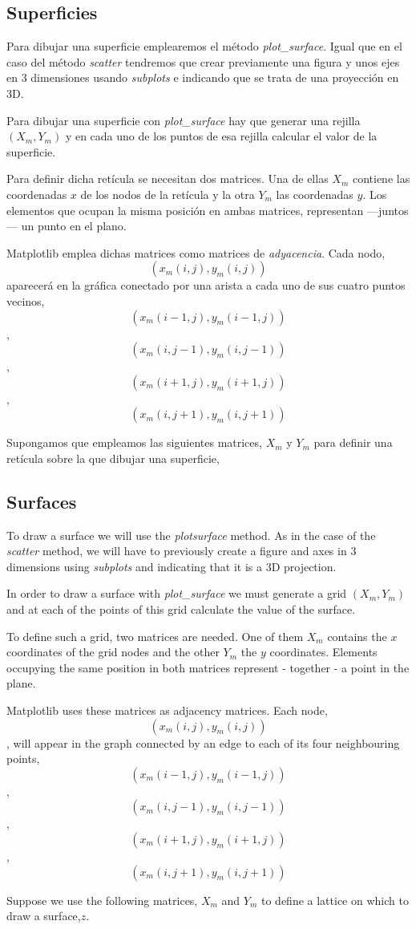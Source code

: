 \begin{paracol}{2}
\subsection{Superficies}
Para dibujar una superficie emplearemos el método \textit{plot\_surface}. Igual que en el caso del método \textit{scatter} tendremos que crear previamente una figura y unos ejes en 3 dimensiones usando \textit{subplots} e indicando que se trata de una proyección en 3D.

Para dibujar una superficie con \textit{plot\_surface} hay que generar una rejilla $(X_m,Y_m)$ y en cada uno de los puntos de esa rejilla calcular el valor de la superficie.

Para definir dicha retícula  se necesitan dos matrices. Una de ellas $X_m$ contiene las coordenadas $x$ de los nodos de la retícula y la otra $Y_m$ las coordenadas $y$. Los elementos que ocupan la misma posición en ambas matrices, representan ---juntos--- un punto en el plano.

Matplotlib emplea dichas matrices como matrices de \emph{adyacencia}. Cada nodo, 
$$(x_m(i,j),y_m(i,j))$$ 
aparecerá en la gráfica conectado por una arista a cada uno de sus cuatro puntos vecinos, 
$$(x_m(i-1,j),y_m(i-1,j))$$, 
$$(x_m(i,j-1),y_m(i,j-1))$$, 
$$(x_m(i+1,j),y_m(i+1,j))$$, 
$$(x_m(i,j+1),y_m(i,j+1))$$

Supongamos que empleamos las siguientes matrices, $X_m$ y $Y_m$ para definir una retícula sobre la que dibujar una superficie,

\switchcolumn
\subsection{Surfaces}
To draw a surface we will use the \textit{plot\-surface} method. As in the case of the \textit{scatter} method, we will have to previously create a figure and axes in 3 dimensions using \textit{subplots} and indicating that it is a 3D projection.

In order to draw a surface with \textit{plot\_surface} we must generate a grid $(X_m,Y_m)$ and at each of the points of this grid calculate the value of the surface.

To define such a grid, two matrices are needed. One of them $X_m$ contains the $x$ coordinates of the grid nodes and the other $Y_m$ the $y$ coordinates. Elements occupying the same position in both matrices represent - together - a point in the plane.

Matplotlib uses these matrices as adjacency matrices. Each node, $$(x_m(i,j),y_m(i,j))$$,  
will appear in the graph connected by an edge to each of its four neighbouring points, 
$$(x_m(i-1,j),y_m(i-1,j))$$, 
$$(x_m(i,j-1),y_m(i,j-1))$$, 
$$(x_m(i+1,j),y_m(i+1,j))$$, 
$$(x_m(i,j+1),y_m(i,j+1))$$

Suppose we use the following matrices, $X_m$ and $Y_m$ to define a lattice on which to draw a surface,$z$.

\end{paracol}

